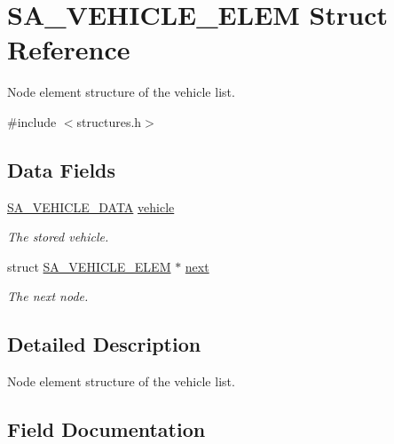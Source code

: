 \hypertarget{struct_s_a___v_e_h_i_c_l_e___e_l_e_m}{}\section{S\+A\+\_\+\+V\+E\+H\+I\+C\+L\+E\+\_\+\+E\+L\+EM Struct Reference}
\label{struct_s_a___v_e_h_i_c_l_e___e_l_e_m}


Node element structure of the vehicle list.  




{\ttfamily \#include $<$structures.\+h$>$}

\subsection*{Data Fields}
\begin{DoxyCompactItemize}
\item 
\hyperlink{struct_s_a___v_e_h_i_c_l_e___d_a_t_a}{S\+A\+\_\+\+V\+E\+H\+I\+C\+L\+E\+\_\+\+D\+A\+TA} \hyperlink{struct_s_a___v_e_h_i_c_l_e___e_l_e_m_a8b1c58d0b6341be5c62063c40fdd5bf2}{vehicle}
\begin{DoxyCompactList}\small\item\em The stored vehicle. \end{DoxyCompactList}\item 
struct \hyperlink{struct_s_a___v_e_h_i_c_l_e___e_l_e_m}{S\+A\+\_\+\+V\+E\+H\+I\+C\+L\+E\+\_\+\+E\+L\+EM} $\ast$ \hyperlink{struct_s_a___v_e_h_i_c_l_e___e_l_e_m_a3453ed6d13776f9cdac63f6047c663ab}{next}
\begin{DoxyCompactList}\small\item\em The next node. \end{DoxyCompactList}\end{DoxyCompactItemize}


\subsection{Detailed Description}
Node element structure of the vehicle list. 

\subsection{Field Documentation}
